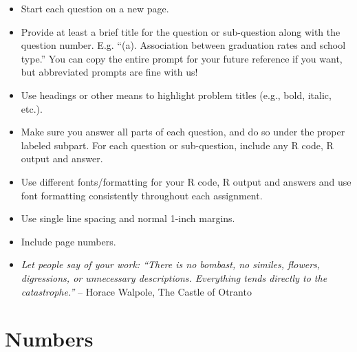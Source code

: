 \documentclass[
  letterpaper,
  DIV=11,
  numbers=noendperiod]{scrreprt}
\providecommand{\tightlist}{%
  \setlength{\itemsep}{0pt}\setlength{\parskip}{0pt}}\usepackage{longtable,booktabs,array}
\begin{document}
\begin{itemize}
\tightlist
\item
  Start each question on a new page.
\item
  Provide at least a brief title for the question or sub-question along
  with the question number. E.g. ``(a). Association between graduation
  rates and school type.'' You can copy the entire prompt for your
  future reference if you want, but abbreviated prompts are fine with
  us!
\item
  Use headings or other means to highlight problem titles (e.g., bold,
  italic, etc.).
\item
  Make sure you answer all parts of each question, and do so under the
  proper labeled subpart. For each question or sub-question, include any
  R code, R output and answer.
\item
  Use different fonts/formatting for your R code, R output and answers
  and use font formatting consistently throughout each assignment.
\item
  Use single line spacing and normal 1-inch margins.
\item
  Include page numbers.
\item
  \emph{Let people say of your work: ``There is no bombast, no similes,
  flowers, digressions, or unnecessary descriptions. Everything tends
  directly to the catastrophe.''} -- Horace Walpole, The Castle of
  Otranto
\end{itemize}

\hypertarget{numbers}{%
\section*{Numbers}\label{numbers}}

\end{document}
